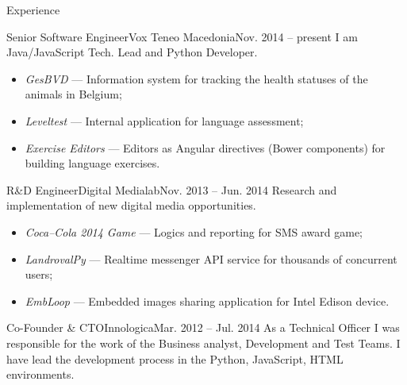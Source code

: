 \documentclass[]{mcdowellcv}
\begin{document}
    \begin{cvsection}{Experience}
    \label{Employment Record}
        \begin{cvsubsection}{Senior Software Engineer}{Vox Teneo Macedonia}{Nov. 2014 -- present}
            I am Java/JavaScript Tech. Lead and Python Developer.
            \begin{itemize}
                \item \textit{GesBVD} --- Information system for tracking the health statuses of the animals in Belgium;
                \item \textit{Leveltest} --- Internal application for language assessment;
                \item \textit{Exercise Editors} --- Editors as Angular directives (Bower components) for building language exercises.
            \end{itemize}
        \end{cvsubsection}
        \begin{cvsubsection}{R\&D Engineer}{Digital Medialab}{Nov. 2013 -- Jun. 2014}
            Research and implementation of new digital media opportunities.
            \begin{itemize}
                \item \textit{Coca--Cola 2014 Game} --- Logics and reporting for SMS award game;
                \item \textit{LandrovalPy} --- Realtime messenger API service for thousands of concurrent users;
                \item \textit{EmbLoop} --- Embedded images sharing application for Intel Edison device.
            \end{itemize}
        \end{cvsubsection}
        \begin{cvsubsection}{Co-Founder \& CTO}{Innologica}{Mar. 2012 -- Jul. 2014}
            As a Technical Officer I was responsible for the work of the Business analyst, Development and Test Teams.\linebreak
            I have lead the development process in the Python, JavaScript, HTML environments.\\

\end{cvsubsection}
\end{cvsection}
\end{document}
